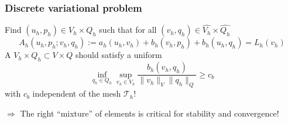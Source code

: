 \begin{frame}
  \frametitle{Discrete variational problem}
  Find $(u_h,p_h) \in V_h \times Q_h$
  such that
  for all  $(v_h,q_h) \in \widehat{V_h} \times \widehat{Q_h}$
\[
  A_h(u_h,p_h;v_h,q_h) := a_h(u_h,v_h) + b_h(v_h,p_h) + b_h(u_h,q_h) =
  L_h(v_h)
\]
  A  $V_h \times Q_h \subset V \times Q$
  should satisfy a uniform 
  \begin{equation*}
    \inf_{q_h \in Q_h} \sup_{v_h\in V_h} \dfrac{b_h(v_h,q_h)}{\| v_h
    \|_V \|q_h\|_Q }
    \geqslant c_b
  \end{equation*}
  with $c_b$ independent of the mesh $\mathcal{T}_h$!

  \bigskip

  $\Rightarrow$ The right ``mixture'' of elements is \alert{critical}
  for stability and convergence!

\end{frame}
